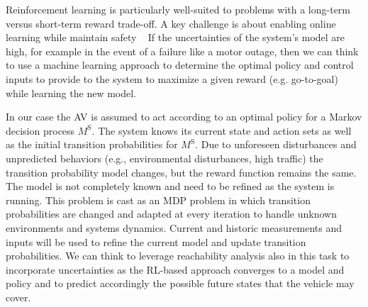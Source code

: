 Reinforcement learning is particularly well-suited to problems with a long-term versus short-term reward trade-off. A key challenge is about enabling online learning while maintain safety ~\cite{kearns2002near, abbeel2005exploration, abbeel2006using}
If the uncertainties of the system's model are high, for example in the event of a failure like a motor outage, then we can think to use a machine learning approach to determine the optimal policy and control inputs to provide to the system to maximize a given reward (e.g. go-to-goal) while learning the new model.

In our case the AV is assumed to act according to an optimal policy for a Markov decision process $M^{\mbox{S}}$. The system knows its current state and action sets as well as the initial transition probabilities for $M^{\mbox{S}}$. Due to unforeseen disturbances and unpredicted behaviors (e.g., environmental disturbances, high traffic) the transition probability model changes, but the reward function remains the same. The model is not completely known and need to be refined as the system is running. This problem is cast as an MDP problem in which transition probabilities are changed and adapted at every iteration to handle unknown environments and systems dynamics. Current and historic measurements and inputs will be used to refine the current model and update transition probabilities. We can think to leverage reachability analysis also in this task to incorporate uncertainties as the RL-based approach converges to a model and policy and to predict accordingly the possible future states that the vehicle may cover. 


